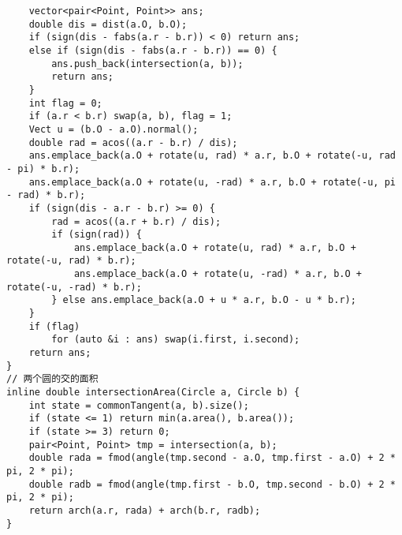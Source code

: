 \begin{verbatim}
    vector<pair<Point, Point>> ans;
    double dis = dist(a.O, b.O);
    if (sign(dis - fabs(a.r - b.r)) < 0) return ans;
    else if (sign(dis - fabs(a.r - b.r)) == 0) {
        ans.push_back(intersection(a, b));
        return ans;
    }
    int flag = 0;
    if (a.r < b.r) swap(a, b), flag = 1;
    Vect u = (b.O - a.O).normal();
    double rad = acos((a.r - b.r) / dis);
    ans.emplace_back(a.O + rotate(u, rad) * a.r, b.O + rotate(-u, rad - pi) * b.r);
    ans.emplace_back(a.O + rotate(u, -rad) * a.r, b.O + rotate(-u, pi - rad) * b.r);
    if (sign(dis - a.r - b.r) >= 0) {
        rad = acos((a.r + b.r) / dis);
        if (sign(rad)) {
            ans.emplace_back(a.O + rotate(u, rad) * a.r, b.O + rotate(-u, rad) * b.r);
            ans.emplace_back(a.O + rotate(u, -rad) * a.r, b.O + rotate(-u, -rad) * b.r);
        } else ans.emplace_back(a.O + u * a.r, b.O - u * b.r);
    }
    if (flag)
        for (auto &i : ans) swap(i.first, i.second);
    return ans;
}
// 两个圆的交的面积
inline double intersectionArea(Circle a, Circle b) {
    int state = commonTangent(a, b).size();
    if (state <= 1) return min(a.area(), b.area());
    if (state >= 3) return 0;
    pair<Point, Point> tmp = intersection(a, b);
    double rada = fmod(angle(tmp.second - a.O, tmp.first - a.O) + 2 * pi, 2 * pi);
    double radb = fmod(angle(tmp.first - b.O, tmp.second - b.O) + 2 * pi, 2 * pi);
    return arch(a.r, rada) + arch(b.r, radb);
}
\end{verbatim}